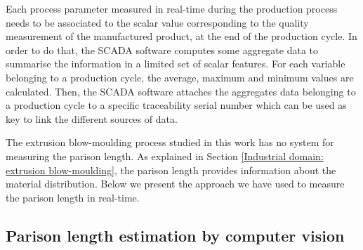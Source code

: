 Each process parameter measured in real-time during the production process needs to be associated to the scalar value corresponding to the quality measurement of the manufactured product, at the end of the production cycle. In order to do that, the SCADA software computes some aggregate data to summarise the information in a limited set of scalar features. For each variable belonging to a production cycle, the average, maximum and minimum values are calculated. Then, the SCADA software attaches the aggregates data belonging to a production cycle to a specific traceability serial number which can be used as key to link the different sources of data. 

The extrusion blow-moulding process studied in this work has no system for measuring the parison length. As explained in Section \ref{Industrial domain: extrusion blow-moulding}, the parison length provides information about the material distribution.  Below we present the approach we have used to measure the parison length in real-time.

\subsection{Parison length estimation by computer vision}

